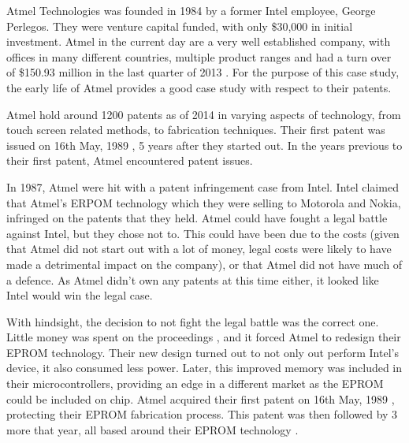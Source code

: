 
{}


Atmel Technologies was founded in 1984 by a former Intel employee, George Perlegos.
They were venture capital funded, with only \$30,000 in initial investment.
Atmel in the current day are a very well established company, with offices in many different countries, multiple product ranges and had a turn over of \$150.93 million in the last quarter of 2013 \cite{atmel:profit}.
For the purpose of this case study, the early life of Atmel provides a good case study with respect to their patents.


Atmel hold around 1200 patents as of 2014 \citeneeded in varying aspects of technology, from touch screen related methods, to fabrication techniques.
Their first patent was issued on 16th May, 1989 \citeneeded, 5 years after they started out.
In the years previous to their first patent, Atmel encountered patent issues.

In 1987, Atmel were hit with a patent infringement case from Intel.
Intel claimed that Atmel's ERPOM technology which they were selling to Motorola and Nokia, infringed on the patents that they held.
Atmel could have fought a legal battle against Intel, but they chose not to. 
This could have been due to the costs (given that Atmel did not start out with a lot of money, legal costs were likely to have made a detrimental impact on the company), or that Atmel did not have much of a defence.
As Atmel didn't own any patents at this time either, it looked like Intel would win the legal case. 

With hindsight, the decision to not fight the legal battle was the correct one. 
Little money was spent on the proceedings , and it forced Atmel to redesign their EPROM technology.
Their new design turned out to not only out perform Intel's device, it also consumed less power.
Later, this improved memory was included in their microcontrollers, providing an edge in a different market as the EPROM could be included on chip.
Atmel acquired their first patent on 16th May, 1989 \citeneeded, protecting their EPROM fabrication process. 
This patent was then followed by 3 more that year, all based around their EPROM technology \citeneeded.

